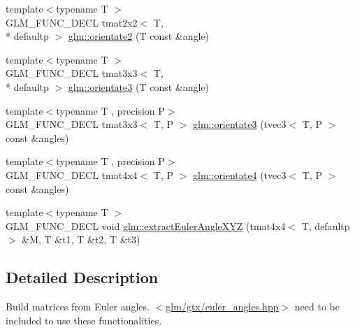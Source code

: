 \begin{DoxyCompactItemize}
\item 
{\footnotesize template$<$typename T $>$ }\\G\-L\-M\-\_\-\-F\-U\-N\-C\-\_\-\-D\-E\-C\-L tmat2x2$<$ T, \\*
defaultp $>$ \hyperlink{group__gtx__euler__angles_ga6f465681cbbc575ad93a53ec918dacf3}{glm\-::orientate2} (T const \&angle)
\item 
{\footnotesize template$<$typename T $>$ }\\G\-L\-M\-\_\-\-F\-U\-N\-C\-\_\-\-D\-E\-C\-L tmat3x3$<$ T, \\*
defaultp $>$ \hyperlink{group__gtx__euler__angles_gab188e2526dea3c003e86e298f618085e}{glm\-::orientate3} (T const \&angle)
\item 
{\footnotesize template$<$typename T , precision P$>$ }\\G\-L\-M\-\_\-\-F\-U\-N\-C\-\_\-\-D\-E\-C\-L tmat3x3$<$ T, P $>$ \hyperlink{group__gtx__euler__angles_ga33f0d790cecd8337ee83f8e3a8109b11}{glm\-::orientate3} (tvec3$<$ T, P $>$ const \&angles)
\item 
{\footnotesize template$<$typename T , precision P$>$ }\\G\-L\-M\-\_\-\-F\-U\-N\-C\-\_\-\-D\-E\-C\-L tmat4x4$<$ T, P $>$ \hyperlink{group__gtx__euler__angles_ga4e25c9468b6f002c76e9a2412bcfa503}{glm\-::orientate4} (tvec3$<$ T, P $>$ const \&angles)
\item 
{\footnotesize template$<$typename T $>$ }\\G\-L\-M\-\_\-\-F\-U\-N\-C\-\_\-\-D\-E\-C\-L void \hyperlink{group__gtx__euler__angles_ga77ab6440250bd8b7e87a06c5643d6e74}{glm\-::extract\-Euler\-Angle\-X\-Y\-Z} (tmat4x4$<$ T, defaultp $>$ \&M, T \&t1, T \&t2, T \&t3)
\end{DoxyCompactItemize}


\subsection{Detailed Description}
Build matrices from Euler angles. $<$\hyperlink{euler__angles_8hpp}{glm/gtx/euler\-\_\-angles.\-hpp}$>$ need to be included to use these functionalities. 

